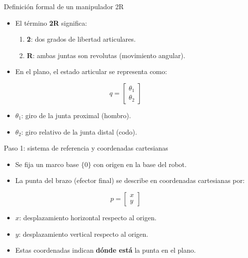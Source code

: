 \documentclass[aspectratio=169]{beamer}
\begin{document}
\begin{frame}{Definición formal de un manipulador 2R}
\begin{itemize}
  \item El término \textbf{2R} significa:
  \begin{enumerate}
    \item \textbf{2}: dos grados de libertad articulares.
    \item \textbf{R}: ambas juntas son revolutas (movimiento angular).
  \end{enumerate}
  \item En el plano, el estado articular se representa como:
\end{itemize}
\[
q = \begin{bmatrix}\theta_1 \\ \theta_2\end{bmatrix}
\]
\begin{itemize}
  \item $\theta_1$: giro de la junta proximal (hombro).
  \item $\theta_2$: giro relativo de la junta distal (codo).
\end{itemize}
\end{frame}

\begin{frame}{Paso 1: sistema de referencia y coordenadas cartesianas}
\begin{itemize}
  \item Se fija un marco base $\{0\}$ con origen en la base del robot.
  \item La punta del brazo (efector final) se describe en coordenadas cartesianas por:
\end{itemize}
\[
p = \begin{bmatrix}x \\ y\end{bmatrix}
\]
\begin{itemize}
  \item $x$: desplazamiento horizontal respecto al origen.
  \item $y$: desplazamiento vertical respecto al origen.
  \item Estas coordenadas indican \textbf{dónde está} la punta en el plano.
\end{itemize}
\end{frame}
\end{document}
